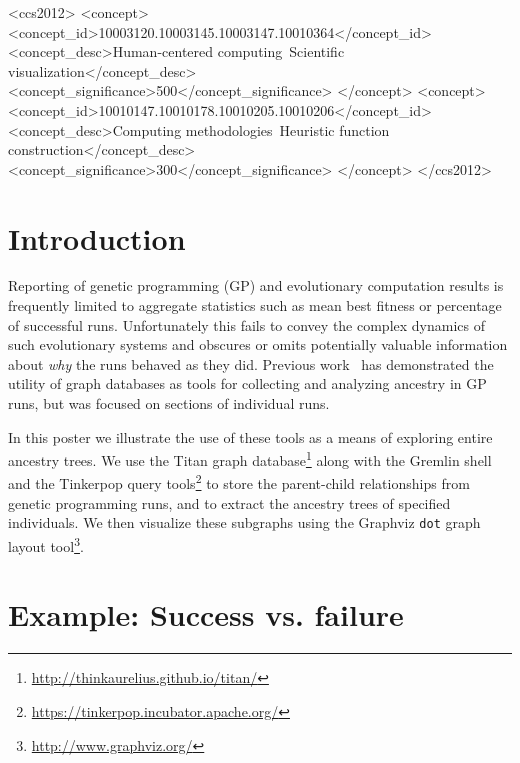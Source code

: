 \documentclass{sig-alternate}
\begin{document}
\begin{CCSXML}
	<ccs2012>
	<concept>
	<concept_id>10003120.10003145.10003147.10010364</concept_id>
	<concept_desc>Human-centered computing~Scientific visualization</concept_desc>
	<concept_significance>500</concept_significance>
	</concept>
	<concept>
	<concept_id>10010147.10010178.10010205.10010206</concept_id>
	<concept_desc>Computing methodologies~Heuristic function construction</concept_desc>
	<concept_significance>300</concept_significance>
	</concept>
	</ccs2012>
\end{CCSXML}


\printccsdesc


\section{Introduction}
\label{sec:introduction}

Reporting of genetic programming (GP) and evolutionary computation results is frequently limited to aggregate statistics such as mean best fitness or percentage of successful runs. Unfortunately this fails to convey the complex dynamics of such evolutionary systems and obscures or omits potentially valuable information about \emph{why} the runs behaved as they did. Previous work~\cite{McPhee:2015:GPTP} has demonstrated the utility of graph databases as tools for collecting and analyzing ancestry in GP runs, but was focused on sections of individual runs.

In this poster we illustrate the use of these tools as a means of exploring entire ancestry trees. We use the Titan graph database\footnote{\url{http://thinkaurelius.github.io/titan/}} along with the Gremlin shell and the Tinkerpop query tools\footnote{\url{https://tinkerpop.incubator.apache.org/}} to store the parent-child relationships from genetic programming runs, and to extract the ancestry trees of specified individuals. We then visualize these subgraphs using the Graphviz \texttt{dot} graph layout tool\footnote{\url{http://www.graphviz.org/}}.

\section{Example: Success vs. failure}
\label{sec:examples}
\end{document}
